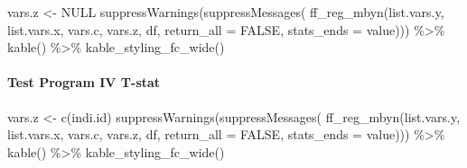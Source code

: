 \documentclass[
]{book}
\newenvironment{Shaded}{\begin{snugshade}}{\end{snugshade}}
\newcommand{\AttributeTok}[1]{\textcolor[rgb]{0.77,0.63,0.00}{#1}}
\newcommand{\ConstantTok}[1]{\textcolor[rgb]{0.00,0.00,0.00}{#1}}
\newcommand{\FunctionTok}[1]{\textcolor[rgb]{0.00,0.00,0.00}{#1}}
\newcommand{\NormalTok}[1]{#1}
\newcommand{\OtherTok}[1]{\textcolor[rgb]{0.56,0.35,0.01}{#1}}
\newcommand{\SpecialCharTok}[1]{\textcolor[rgb]{0.00,0.00,0.00}{#1}}
\newcommand{\StringTok}[1]{\textcolor[rgb]{0.31,0.60,0.02}{#1}}
\begin{document}
\begin{Shaded}
\begin{Highlighting}[]
\NormalTok{vars.z }\OtherTok{\textless{}{-}} \ConstantTok{NULL}
\FunctionTok{suppressWarnings}\NormalTok{(}\FunctionTok{suppressMessages}\NormalTok{(}
  \FunctionTok{ff\_reg\_mbyn}\NormalTok{(list.vars.y, list.vars.x,}
\NormalTok{              vars.c, vars.z, df,}
              \AttributeTok{return\_all =} \ConstantTok{FALSE}\NormalTok{,}
              \AttributeTok{stats\_ends =} \StringTok{\textquotesingle{}value\textquotesingle{}}\NormalTok{))) }\SpecialCharTok{\%\textgreater{}\%}
  \FunctionTok{kable}\NormalTok{() }\SpecialCharTok{\%\textgreater{}\%}
  \FunctionTok{kable\_styling\_fc\_wide}\NormalTok{()}
\end{Highlighting}
\end{Shaded}

\begin{table}[!h]
\centering
{}
\end{table}

\hypertarget{test-program-iv-t-stat}{%
\paragraph{Test Program IV T-stat}\label{test-program-iv-t-stat}}

\begin{Shaded}
\begin{Highlighting}[]
\NormalTok{vars.z }\OtherTok{\textless{}{-}} \FunctionTok{c}\NormalTok{(}\StringTok{\textquotesingle{}indi.id\textquotesingle{}}\NormalTok{)}
\FunctionTok{suppressWarnings}\NormalTok{(}\FunctionTok{suppressMessages}\NormalTok{(}
  \FunctionTok{ff\_reg\_mbyn}\NormalTok{(list.vars.y, list.vars.x,}
\NormalTok{              vars.c, vars.z, df,}
              \AttributeTok{return\_all =} \ConstantTok{FALSE}\NormalTok{,}
              \AttributeTok{stats\_ends =} \StringTok{\textquotesingle{}value\textquotesingle{}}\NormalTok{))) }\SpecialCharTok{\%\textgreater{}\%}
  \FunctionTok{kable}\NormalTok{() }\SpecialCharTok{\%\textgreater{}\%}
  \FunctionTok{kable\_styling\_fc\_wide}\NormalTok{()}
\end{Highlighting}
\end{Shaded}
\end{document}
